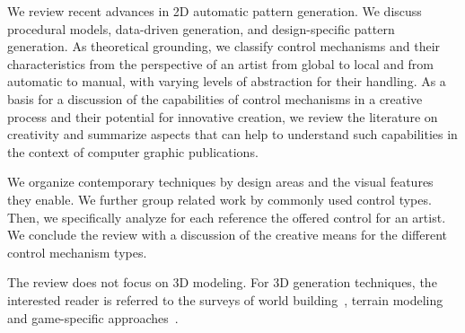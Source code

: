We review recent advances in 2D automatic pattern generation. We discuss procedural models, data-driven generation, and design-specific pattern generation. As theoretical grounding, we classify control mechanisms and their characteristics from the perspective of an artist from global to local and from automatic to manual, with varying levels of abstraction for their handling. As a basis for a discussion of the capabilities of control mechanisms in a creative process and their potential for innovative creation, we review the literature on creativity and summarize aspects that can help to understand such capabilities in the context of computer graphic publications.

We organize contemporary techniques by design areas and the visual features they enable. We further group related work by commonly used control types. Then, we specifically analyze for each reference the offered control for an artist. 
We conclude the review with a discussion of the creative means for the different control mechanism types.

The review does not focus on 3D modeling. For 3D generation techniques, the interested reader is referred to the surveys of world building~\cite{smelik_2014_aso, aliaga_2016_ipm}, terrain modeling~\cite{galin_2019_aro} and game-specific approaches~\cite{hendrikx_2013_pcg, togelius_2011_sbp}.


